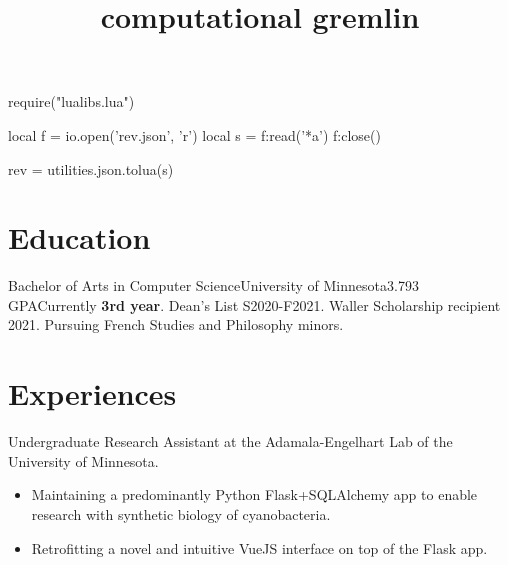 \documentclass{moderncv}
\title{computational gremlin}
\newcommand{\comment}[1]{}
\begin{document}
\begin{luacode}
require("lualibs.lua")

local f = io.open('rev.json', 'r')
local s = f:read('*a')
f:close()

rev = utilities.json.tolua(s)
\end{luacode}

\newcommand{\githash}{\href{https://github.com/knownunown/website/blob/\luadirect{tex.sprint(rev)}/cv.tex}
  {\luadirect{tex.sprint(rev)}}}

\makecvtitle{}
\vspace*{-5mm} %

\section{Education}
{
  Bachelor of Arts in Computer Science}{University of Minnesota}{}{3.793 GPA}{Currently \textbf{3rd year}. Dean's List S2020-F2021. Waller Scholarship recipient 2021. Pursuing French Studies and Philosophy minors.
}

\comment{
\subsection{selected CSCI coursework}
\cvlistitem{CSCI2021, Machine Architecture and Organization}
\cvlistitem{CSCI2041, Advanced Programming Principles}
\cvlistitem{CSCI2033, Elementary Computational Linear Algebra}
\cvlistitem{CSCI5551, Introduction to Intelligent Robotic Systems (in-progress)}
\cvlistitem{CSCI4611, Programming Interactive Computer Graphics and Games (in-progress)}
}

\section{Experiences}
{
  Undergraduate Research Assistant at the Adamala-Engelhart Lab of the University of Minnesota.
  \begin{itemize}[label=\textbullet,noitemsep]
  \item Maintaining a predominantly Python Flask+SQLAlchemy app to enable research with synthetic biology of cyanobacteria.
  \item Retrofitting a novel and intuitive VueJS interface on top of the Flask app.
  \end{itemize}
}
   
\end{document}
